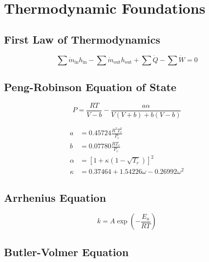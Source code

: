\documentclass[12pt,twoside,openany]{book}
\begin{document}

\chapter{Thermodynamic Foundations}

\section{First Law of Thermodynamics}

\begin{dmath}
\boxed{\sum \dot{m}_{\text{in}} h_{\text{in}}
      - \sum \dot{m}_{\text{out}} h_{\text{out}}
      + \sum \dot{Q} - \sum \dot{W} = 0}
\end{dmath}

\section{Peng-Robinson Equation of State}

\begin{dmath}
\boxed{P = \frac{RT}{V - b} - \frac{a\alpha}{V(V + b) + b(V - b)}}
\end{dmath}

\begin{align}
a      &= 0.45724 \frac{R^2 T_c^2}{P_c} \\
b      &= 0.07780 \frac{RT_c}{P_c} \\
\alpha &= \left[1 + \kappa\left(1 - \sqrt{T_r}\right)\right]^2 \\
\kappa &= 0.37464 + 1.54226\omega - 0.26992\omega^2
\end{align}

\section{Arrhenius Equation}

\begin{dmath}
\boxed{k = A \exp\!\left(-\frac{E_a}{RT}\right)}
\end{dmath}

\section{Butler-Volmer Equation}
\end{document}
